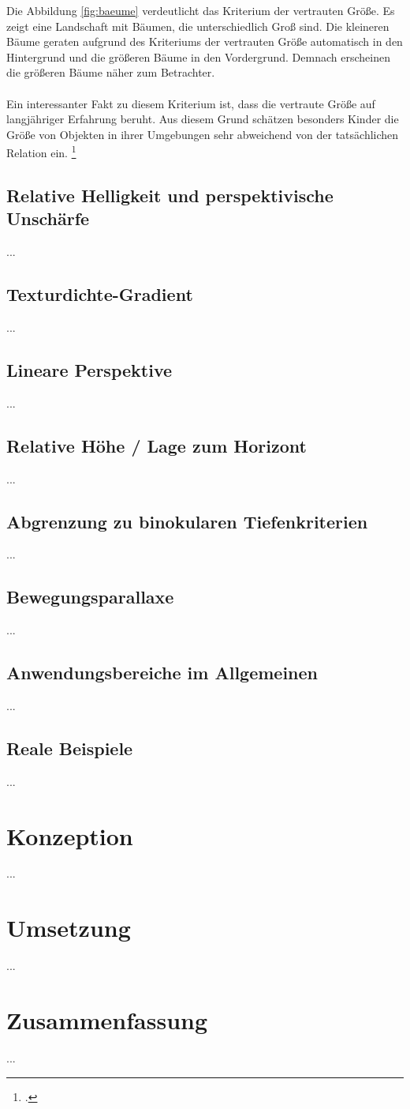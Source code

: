 Die Abbildung \ref{fig:baeume} verdeutlicht das Kriterium der vertrauten Größe. Es zeigt eine Landschaft mit Bäumen, die unterschiedlich Groß sind. Die kleineren Bäume geraten aufgrund des Kriteriums der vertrauten Größe automatisch in den Hintergrund und die größeren Bäume in den Vordergrund. Demnach erscheinen die größeren Bäume näher zum Betrachter.\\
\\
Ein interessanter Fakt zu diesem Kriterium ist, dass die vertraute Größe auf langjähriger Erfahrung beruht. Aus diesem Grund schätzen besonders Kinder die Größe von Objekten in ihrer Umgebungen sehr abweichend von der tatsächlichen Relation ein. \footcite[Vgl.]{Helm1867}

\subsection{Relative Helligkeit und perspektivische Unschärfe}
...

\subsection{Texturdichte-Gradient}
...

\subsection{Lineare Perspektive}
...

\subsection{Relative Höhe / Lage zum Horizont}
...

\subsection{Abgrenzung zu binokularen Tiefenkriterien}
...

\subsection{Bewegungsparallaxe}
...

\subsection{Anwendungsbereiche im Allgemeinen}
...

\subsection{Reale Beispiele}
...

\section{Konzeption}
...

\section{Umsetzung}
...

\section{Zusammenfassung}
...